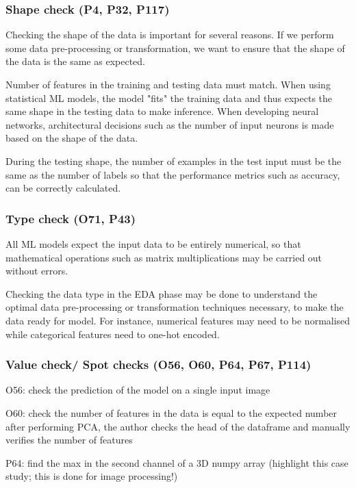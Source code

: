\subsubsection{Shape check (P4, P32, P117)}

Checking the shape of the data is important for several reasons. If we perform some data pre-processing or transformation, we want to ensure that the shape of the data is the same as expected.

Number of features in the training and testing data must match. When using statistical ML models, the model "fits" the training data and thus expects the same shape in the testing data to make inference. When developing neural networks, architectural decisions such as the number of input neurons is made based on the shape of the data.

During the testing shape, the number of examples in the test input must be the same as the number of labels so that the performance metrics such as accuracy, can be correctly calculated.

\subsubsection{Type check (O71, P43)}

All ML models expect the input data to be entirely numerical, so that mathematical operations such as matrix multiplications may be carried out without errors.

Checking the data type in the EDA phase may be done to understand the optimal data pre-processing or transformation techniques necessary, to make the data ready for model. For instance, numerical features may need to be normalised while categorical features need to one-hot encoded.

\subsubsection{Value check/ Spot checks (O56, O60, P64, P67, P114)}

O56: check the prediction of the model on a single input image

O60: check the number of features in the data is equal to the expected number after performing PCA, the author checks the head of the dataframe and manually verifies the number of features

P64: find the max in the second channel of a 3D numpy array (highlight this case study; this is done for image processing!)


